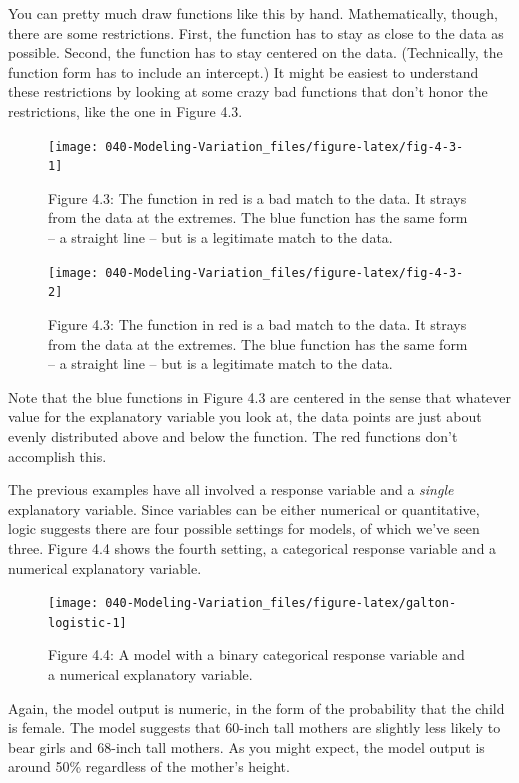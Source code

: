 \documentclass[]{tufte-book}
\begin{document}
You can pretty much draw functions like this by hand. Mathematically, though, there are some restrictions. First, the function has to stay as close to the data as possible. Second, the function has to stay centered on the data. (Technically, the function form has to include an intercept.) It might be easiest to understand these restrictions by looking at some crazy bad functions that don't honor the restrictions, like the one in Figure 4.3.

\begin{figure}\texttt{[image: 040-Modeling-Variation\_files/figure-latex/fig-4-3-1]} \caption[Figure 4.3]{Figure 4.3: The function in red is a bad match to the data. It strays from the data at the extremes. The blue function has the same form -- a straight line -- but is a legitimate match to the data.}\label{fig:fig-4-31}
\end{figure}
\begin{figure}\texttt{[image: 040-Modeling-Variation\_files/figure-latex/fig-4-3-2]} \caption[Figure 4.3]{Figure 4.3: The function in red is a bad match to the data. It strays from the data at the extremes. The blue function has the same form -- a straight line -- but is a legitimate match to the data.}\label{fig:fig-4-32}
\end{figure}

Note that the blue functions in Figure 4.3 are centered in the sense that whatever value for the explanatory variable you look at, the data points are just about evenly distributed above and below the function. The red functions don't accomplish this.

The previous examples have all involved a response variable and a \emph{single} explanatory variable. Since variables can be either numerical or quantitative, logic suggests there are four possible settings for models, of which we've seen three. Figure 4.4 shows the fourth setting, a categorical response variable and a numerical explanatory variable.

\begin{figure}\texttt{[image: 040-Modeling-Variation\_files/figure-latex/galton-logistic-1]} \caption[Figure 4.4]{Figure 4.4: A model with a binary categorical response variable and a numerical explanatory variable.}\label{fig:galton-logistic}
\end{figure}

Again, the model output is numeric, in the form of the probability that the child is female. The model suggests that 60-inch tall mothers are slightly less likely to bear girls and 68-inch tall mothers. As you might expect, the model output is around 50\% regardless of the mother's height.
\end{document}
